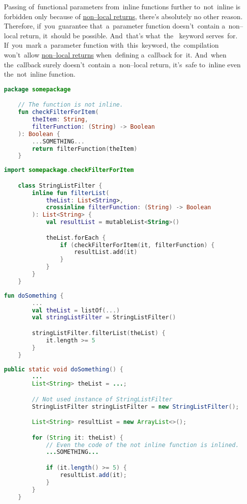 Passing of~functional parameters from~inline functions further to~not~inline is forbidden only because of \hyperref[kotlinnonlocalreturn]{\mbox{non--local} returns}, there's absolutely no other reason.
Therefore, if~you~guarantee that~a~parameter function doesn't~contain \mbox{a non--local} return, it~should be possible.
And~that's what~the~ keyword serves~for.
If~you~mark a~parameter function with~this~keyword, the~compilation won't~allow \hyperref[kotlinnonlocalreturn]{\mbox{non--local} returns} when~defining a~callback for~it.
And~when the~callback surely doesn't~contain \mbox{a non--local} return, it's~safe to~inline even the~not~inline function.

\begin{lstlisting}[language=Kotlin, title={Special function for filtering in a standalone library}]
    package somepackage

    // The function is not inline.
    fun checkFilterForItem(
        theItem: String,
        filterFunction: (String) -> Boolean
    ): Boolean {
        ...SOMETHING...
        return filterFunction(theItem)
    }
\end{lstlisting}
\begin{lstlisting}[language=Kotlin, title={Passing callback from inline function to not inline}]
    import somepackage.checkFilterForItem

    class StringListFilter {
        inline fun filterList(
            theList: List<String>,
            crossinline filterFunction: (String) -> Boolean
        ): List<String> {
            val resultList = mutableList<String>()

            theList.forEach {
                if (checkFilterForItem(it, filterFunction) {
                    resultList.add(it)
                }
            }
        }
    }
\end{lstlisting}
\begin{lstlisting}[language=Kotlin, title={Calling the~inline function}]
    fun doSomething {
        ...
        val theList = listOf(...)
        val stringListFilter = StringListFilter()

        stringListFilter.filterList(theList) {
            it.length >= 5
        }
    }
\end{lstlisting}
\begin{lstlisting}[language=Java, title={Rough Java equivalent of the generated bytecode}]
    public static void doSomething() {
        ...
        List<String> theList = ...;

        // Not used instance of StringListFilter
        StringListFilter stringListFilter = new StringListFilter();

        List<String> resultList = new ArrayList<>();

        for (String it: theList) {
            // Even the code of the not inline function is inlined.
            ...SOMETHING...

            if (it.length() >= 5) {
                resultList.add(it);
            }
        }
    }
\end{lstlisting}
